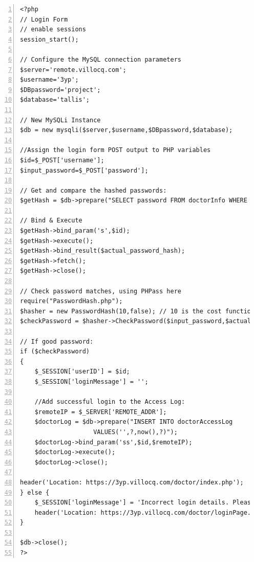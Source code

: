 \documentclass[11pt]{article}
\begin{document}
\begin{lstlisting}[numbers=left,frame=lines,label=doctor-login-form,showstringspaces=false]
<?php
// Login Form
// enable sessions
session_start();

// Configure the MySQL connection parameters
$server='remote.villocq.com';
$username='3yp';
$DBpassword='project';
$database='tallis';

// New MySQLi Instance
$db = new mysqli($server,$username,$DBpassword,$database);

//Assign the login form POST output to PHP variables
$id=$_POST['username'];
$input_password=$_POST['password'];

// Get and compare the hashed passwords:
$getHash = $db->prepare("SELECT password FROM doctorInfo WHERE id=?");

// Bind & Execute
$getHash->bind_param('s',$id);
$getHash->execute();
$getHash->bind_result($actual_password_hash);
$getHash->fetch();
$getHash->close();

// Check password matches, using PHPass here
require("PasswordHash.php");
$hasher = new PasswordHash(10,false); // 10 is the cost function setting
$checkPassword = $hasher->CheckPassword($input_password,$actual_password_hash);

// If good password:
if ($checkPassword)  
{
    $_SESSION['userID'] = $id;
    $_SESSION['loginMessage'] = '';
    
    //Add successful login to the Access Log:
    $remoteIP = $_SERVER['REMOTE_ADDR'];
    $doctorLog = $db->prepare("INSERT INTO doctorAccessLog 
    				VALUES('',?,now(),?)");
    $doctorLog->bind_param('ss',$id,$remoteIP);
    $doctorLog->execute();
    $doctorLog->close();
    
header('Location: https://3yp.villocq.com/doctor/index.php'); 
} else {
    $_SESSION['loginMessage'] = 'Incorrect login details. Please try again.';
    header('Location: https://3yp.villocq.com/doctor/loginPage.php'); 
}

$db->close();
?>
\end{lstlisting}
\end{document}
